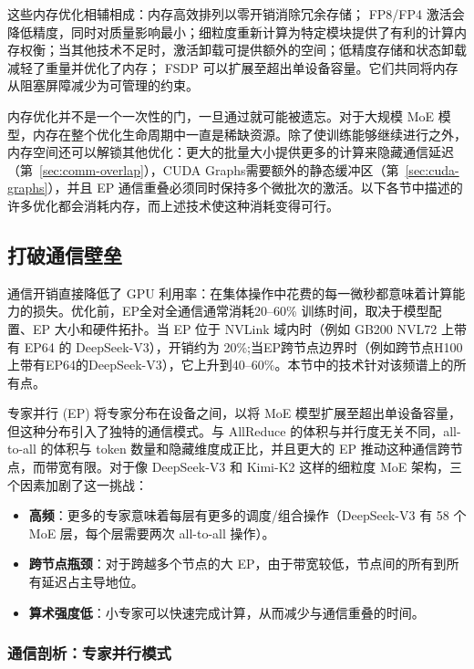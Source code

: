 \documentclass[10pt,logo,copyright]{nvidiatechreport_zh}
\begin{document}
这些内存优化相辅相成：内存高效排列以零开销消除冗余存储； FP8/FP4 激活会降低精度，同时对质量影响最小；细粒度重新计算为特定模块提供了有利的计算内存权衡；当其他技术不足时，激活卸载可提供额外的空间；低精度存储和状态卸载减轻了重量并优化了内存； FSDP 可以扩展至超出单设备容量。它们共同将内存从阻塞屏障减少为可管理的约束。

内存优化并不是一个一次性的门，一旦通过就可能被遗忘。对于大规模 MoE 模型，内存在整个优化生命周期中一直是稀缺资源。除了使训练能够继续进行之外，内存空间还可以解锁其他优化：更大的批量大小提供更多的计算来隐藏通信延迟（第~\ref{sec:comm-overlap}），CUDA Graphs需要额外的静态缓冲区（第~\ref{sec:cuda-graphs}），并且 EP 通信重叠必须同时保持多个微批次的激活。以下各节中描述的许多优化都会消耗内存，而上述技术使这种消耗变得可行。

\subsection{打破通信壁垒}\label{sec:comm-wall}

通信开销直接降低了 GPU 利用率：在集体操作中花费的每一微秒都意味着计算能力的损失。优化前，EP全对全通信通常消耗20--60\% 训练时间，取决于模型配置、EP 大小和硬件拓扑。当 EP 位于 NVLink 域内时（例如 GB200 NVL72 上带有 EP64 的 DeepSeek-V3），开销约为 20\%;当EP跨节点边界时（例如跨节点H100上带有EP64的DeepSeek-V3），它上升到40--60\%。本节中的技术针对该频谱上的所有点。

专家并行 (EP) 将专家分布在设备之间，以将 MoE 模型扩展至超出单设备容量，但这种分布引入了独特的通信模式。与 AllReduce 的体积与并行度无关不同，all-to-all 的体积与 token 数量和隐藏维度成正比，并且更大的 EP 推动这种通信跨节点，而带宽有限。对于像 DeepSeek-V3 和 Kimi-K2 这样的细粒度 MoE 架构，三个因素加剧了这一挑战：

\begin{itemize}
    \item \textbf{高频}：更多的专家意味着每层有更多的调度/组合操作（DeepSeek-V3 有 58 个 MoE 层，每个层需要两次 all-to-all 操作）。
    \item \textbf{跨节点瓶颈}：对于跨越多个节点的大 EP，由于带宽较低，节点间的所有到所有延迟占主导地位。
    \item \textbf{算术强度低}：小专家可以快速完成计算，从而减少与通信重叠的时间。
\end{itemize}

\subsubsection{通信剖析：专家并行模式}
\end{document}
